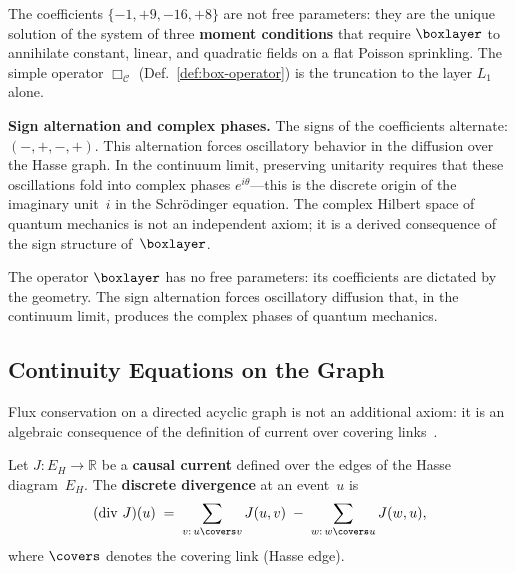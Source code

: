 \noindent
The coefficients $\{-1, +9, -16, +8\}$ are not free parameters: they are
the unique solution of the system of three \textbf{moment conditions}
that require $\boxlayer$ to annihilate constant, linear,
and quadratic fields on a flat Poisson sprinkling.  The simple
operator $\Box_{\mathcal{C}}$ (Def.~\ref{def:box-operator}) is the
truncation to the layer $L_1$ alone.

\medskip\noindent\textbf{Sign alternation and complex phases.}\quad
The signs of the coefficients alternate: $(-,+,-,+)$.  This alternation
forces oscillatory behavior in the diffusion over the Hasse
graph.  In the continuum limit, preserving unitarity requires that
these oscillations fold into complex phases $e^{i\theta}$---this
is the discrete origin of the imaginary unit~$i$ in the
Schr\"odinger equation.  The complex Hilbert space of quantum
mechanics is not an independent axiom; it is a derived consequence
of the sign structure of~$\boxlayer$.

\begin{result}[title={The Layered Operator}]
The operator $\boxlayer$ has no free parameters: its coefficients
are dictated by the geometry.  The sign alternation forces
oscillatory diffusion that, in the continuum limit, produces the
complex phases of quantum mechanics.
\end{result}

\subsection{Continuity Equations on the Graph}
\label{sec:discrete-continuity}

Flux conservation on a directed acyclic graph is not an
additional axiom: it is an algebraic consequence of the definition of
current over covering links~\cite{sorkin2012,johnston2009,aslanbeigi2014}.

\begin{definition}
\label{def:discrete-divergence}
Let $J : E_H \to \mathbb{R}$ be a \textbf{causal current} defined
over the edges of the Hasse diagram~$E_H$.  The \textbf{discrete
divergence} at an event~$u$ is
\begin{equation}
  (\operatorname{div}\,J)(u)
  \;=\;
  \sum_{v:\, u \covers v} J(u,v)
  \;-\;
  \sum_{w:\, w \covers u} J(w,u),
  \label{eq:discrete-divergence}
\end{equation}
where $\covers$ denotes the covering link (Hasse edge).
\end{definition}

